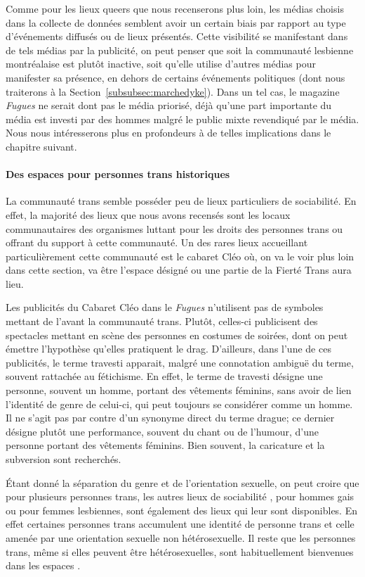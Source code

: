 Comme pour les lieux queers que nous recenserons plus loin, les médias choisis dans la collecte de données semblent avoir un certain biais par rapport au type d'événements diffusés ou de lieux présentés.
Cette visibilité se manifestant dans de tels médias par la publicité, on peut penser que soit la communauté lesbienne montréalaise est plutôt inactive, soit qu'elle utilise d'autres médias pour manifester sa présence, en dehors de certains événements politiques (dont nous traiterons à la Section~\ref{subsubsec:marchedyke}).
Dans un tel cas, le magazine \emph{Fugues} ne serait dont pas le média priorisé, déjà qu'une part importante du média est investi par des hommes malgré le public mixte revendiqué par le média.
Nous nous intéresserons plus en profondeurs à de telles implications dans le chapitre suivant.

\paragraph{Des espaces pour personnes trans historiques}
La communauté trans semble posséder peu de lieux particuliers de sociabilité.
En effet, la majorité des lieux que nous avons recensés sont les locaux communautaires des organismes luttant pour les droits des personnes trans ou offrant du support à cette communauté.
Un des rares lieux accueillant particulièrement cette communauté est le cabaret Cléo où, on va le voir plus loin dans cette section, va être l'espace désigné ou une partie de la Fierté Trans aura lieu.

Les publicités du Cabaret Cléo dans le \emph{Fugues} n'utilisent pas de symboles mettant de l'avant la communauté trans.
Plutôt, celles-ci publicisent des spectacles mettant en scène des personnes en costumes de soirées, dont on peut émettre l'hypothèse qu'elles pratiquent le drag.
D'ailleurs, dans l'une de ces publicités, le terme travesti apparait, malgré une connotation ambiguë du terme, souvent rattachée au fétichisme.
En effet, le terme de travesti désigne une personne, souvent un homme, portant des vêtements féminins, sans avoir de lien l'identité de genre de celui-ci, qui peut toujours se considérer comme un homme.
Il ne s'agit pas par contre d'un synonyme direct du terme drague; ce dernier désigne plutôt une performance, souvent du chant ou de l'humour, d'une personne portant des vêtements féminins.
Bien souvent,  la caricature et la subversion sont recherchés.

Étant donné la séparation du genre et de l'orientation sexuelle, on peut croire que pour plusieurs personnes trans, les autres lieux de sociabilité \lgbt, pour hommes gais ou pour femmes lesbiennes, sont également des lieux qui leur sont disponibles.
En effet certaines personnes trans accumulent une identité de personne trans et celle amenée par une orientation sexuelle non hétérosexuelle.
Il reste que les personnes trans, même si elles peuvent être hétérosexuelles, sont habituellement bienvenues dans les espaces \lgbt{}.

